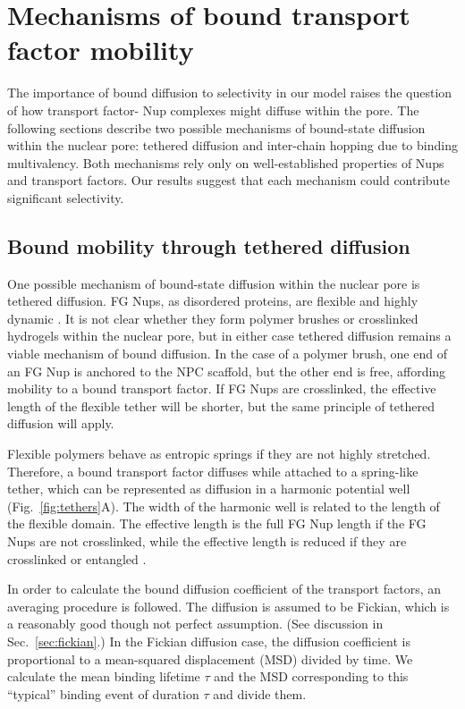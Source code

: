 \section{Mechanisms of  bound transport factor mobility}

The importance of bound diffusion to selectivity in our model raises the question of how transport factor- Nup complexes might diffuse within the pore.  The following sections describe two possible mechanisms of bound-state diffusion within the nuclear pore: tethered diffusion and inter-chain hopping due to binding multivalency.  Both mechanisms rely only on well-established properties of Nups and transport factors.  Our results suggest that each mechanism could contribute significant selectivity.

\subsection{Bound mobility through tethered diffusion}
\label{sec:tethered-diffusion}
One possible mechanism of bound-state diffusion within the nuclear pore is tethered diffusion.  FG Nups, as disordered proteins, are flexible and highly dynamic \cite{lim07, milles14, hough15,patel07}. It is not clear whether they form polymer brushes or crosslinked hydrogels within the nuclear pore, but in either case tethered diffusion remains a viable mechanism of bound diffusion.  In the case of a polymer brush, one end of an FG Nup is anchored to the NPC scaffold, but the other end is free, affording mobility to a bound transport factor.  If FG Nups are crosslinked, the effective length of the flexible tether will be shorter, but the same principle of tethered diffusion will apply.

Flexible polymers behave as entropic springs \cite{howard01} if they are not highly stretched. Therefore, a bound transport factor diffuses while attached to a spring-like tether, which can be represented as diffusion in a harmonic potential well (Fig.~\ref{fig:tethers}A).  The width of the harmonic well is related to the length of the flexible domain.  The effective length is the full FG Nup length if the FG Nups are not crosslinked, while the effective length is reduced if they are crosslinked or entangled \cite{ribbeck01}.  

In order to calculate the bound diffusion coefficient of the transport factors, an averaging procedure is followed.  The diffusion is assumed to be Fickian, which is a reasonably good though not perfect assumption. (See discussion in Sec.~\ref{sec:fickian}.)  In the Fickian diffusion case, the diffusion coefficient is proportional to a mean-squared displacement (MSD) divided by time.  We calculate the mean binding lifetime $\tau$ and the MSD corresponding to this ``typical'' binding event of duration $\tau$ and divide them.

